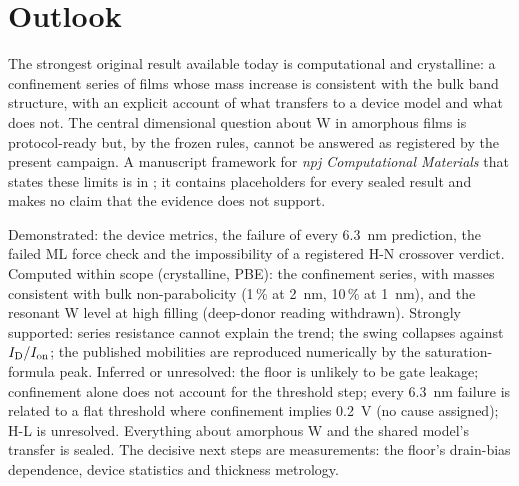 \section{Outlook}
\label{sec:mono-concl-outlook}

The strongest original result available today is computational and crystalline: a confinement series of \InO{} films
whose mass increase is consistent with the bulk band structure, with an explicit account of what transfers to a device model
and what does not. The central dimensional question about W in amorphous films is protocol-ready but, by the frozen
rules, cannot be answered as registered by the present campaign. A manuscript framework for \emph{npj Computational
Materials} that states these limits is in ; it contains placeholders for every
sealed result and makes no claim that the evidence does not support.

\begin{keyresult}
Demonstrated: the device metrics, the failure of every 6.3~nm prediction, the failed ML force check and the
impossibility of a registered H-N crossover verdict. Computed within scope (crystalline, PBE): the confinement series,
with masses consistent with bulk non-parabolicity (1\,\% at 2~nm, 10\,\% at 1~nm), and the resonant W level at high
filling (deep-donor reading withdrawn). Strongly supported: series resistance cannot explain the trend; the swing
collapses against $I_{\mathrm{D}}/I_{\mathrm{on}}$; the published mobilities are reproduced numerically by the saturation-formula peak.
Inferred or unresolved: the floor is unlikely to be gate leakage; confinement alone does not account for the threshold
step; every 6.3~nm failure is related to a flat threshold where confinement implies 0.2~V (no cause assigned); H-L is
unresolved. Everything about amorphous W and the shared
model's transfer is sealed. The decisive next steps are measurements: the floor's drain-bias dependence, device
statistics and thickness metrology.
\end{keyresult}

